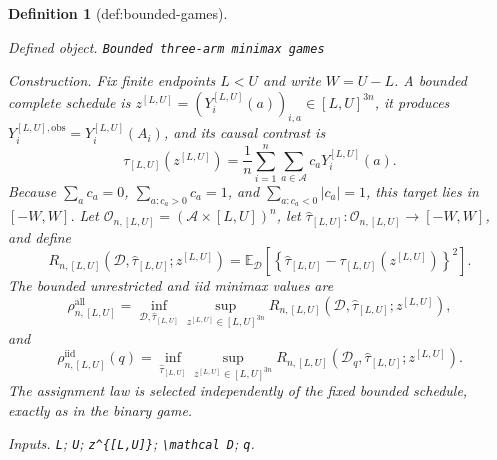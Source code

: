 \documentclass{article}
\newtheorem{definition}{Definition}
\begin{document}
\begin{definition}[def:bounded-games]\label{def:bounded-games}
\par\smallskip\noindent\emph{Defined object.} \texttt{Bounded three-\allowbreak{}arm minimax games}
\par\smallskip\noindent\emph{Construction.} Fix finite endpoints \(L<U\) and write \(W=U-L\).  A bounded complete schedule is
\(z^{[L,U]}=(Y_i^{[L,U]}(a))_{i,a}\in[L,U]^{3n}\), it produces
\(Y_i^{[L,U],\mathrm{obs}}=Y_i^{[L,U]}(A_i)\), and its causal contrast is
\[
\tau_{[L,U]}(z^{[L,U]})
=\frac1n\sum_{i=1}^n\sum_{a\in\mathcal A}c_aY_i^{[L,U]}(a).
\]
Because \(\sum_ac_a=0\), \(\sum_{a:c_a>0}c_a=1\), and
\(\sum_{a:c_a<0}|c_a|=1\), this target lies in \([-W,W]\).  Let
\(\mathcal O_{n,[L,U]}=(\mathcal A\times[L,U])^n\), let
\(\widehat\tau_{[L,U]}:\mathcal O_{n,[L,U]}\to[-W,W]\), and define
\[
R_{n,[L,U]}(\mathcal D,\widehat\tau_{[L,U]};z^{[L,U]})
=\mathbb E_{\mathcal D}\left[
\left\{\widehat\tau_{[L,U]}-\tau_{[L,U]}(z^{[L,U]})\right\}^2\right].
\]
The bounded unrestricted and iid minimax values are
\[
\rho_{n,[L,U]}^{\mathrm{all}}
=\inf_{\mathcal D,\widehat\tau_{[L,U]}}
\sup_{z^{[L,U]}\in[L,U]^{3n}}
R_{n,[L,U]}(\mathcal D,\widehat\tau_{[L,U]};z^{[L,U]}),
\]
and
\[
\rho_{n,[L,U]}^{\mathrm{iid}}(q)
=\inf_{\widehat\tau_{[L,U]}}
\sup_{z^{[L,U]}\in[L,U]^{3n}}
R_{n,[L,U]}(\mathcal D_q,\widehat\tau_{[L,U]};z^{[L,U]}).
\]
The assignment law is selected independently of the fixed bounded schedule, exactly as in the binary game.
\par\smallskip\noindent\emph{Inputs.} \texttt{L}; \texttt{U}; \texttt{z\textasciicircum{}\{[L,\allowbreak{}U]\}\allowbreak{}}; \texttt{\textbackslash{}\allowbreak{}mathcal D}; \texttt{q}.
\end{definition}
\end{document}
